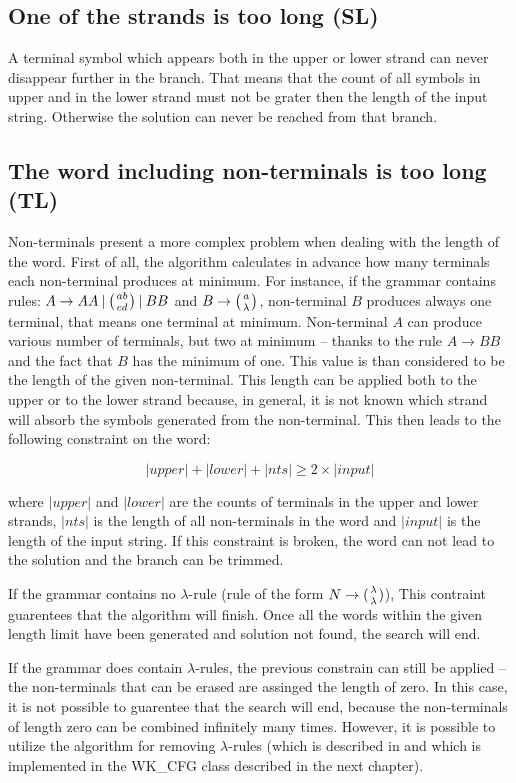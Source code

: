 \subsection{One of the strands is too long (SL)}
A terminal symbol which appears both in the upper or lower strand can never disappear further in the branch. That means that the count of all symbols in upper and in the lower strand must not be grater then the length of the input string. Otherwise the solution can never be reached from that branch.

\subsection{The word including non-terminals is too long (TL)}
Non-terminals present a more complex problem when dealing with the length of the word. First of all, the algorithm calculates in advance how many terminals each non-terminal produces at minimum. For instance, if the grammar contains rules: $A \rightarrow A A \:|\: \wkpair{ab}{cd} \:|\: B B$ and $B \rightarrow \wkpair{a}{\lambda}$, non-terminal $B$ produces always one terminal, that means one terminal at minimum. Non-terminal $A$ can produce various number of terminals, but two at minimum -- thanks to the rule $A \rightarrow B B$ and the fact that $B$ has the minimum of one. This value is than considered to be the length of the given non-terminal.
This length can be applied both to the upper or to the lower strand because, in general, it is not known which strand will absorb the symbols generated from the non-terminal.
This then leads to the following constraint on the word:

$$|upper| + |lower| + |nts| \geq 2 \times |input|$$

where $|upper|$ and $|lower|$ are the counts of terminals in the upper and lower strands, $|nts|$ is the length of all non-terminals in the word and $|input|$ is the length of the input string. If this constraint is broken, the word can not lead to the solution and the branch can be trimmed.


If the grammar contains no $\lambda$-rule (rule of the form $N \rightarrow ({\lambda \atop \lambda})$), This contraint guarentees that the algorithm will finish. Once all the words within the given length limit have been generated and solution not found, the search will end.

If the grammar does contain $\lambda$-rules, the previous constrain can still be applied -- the non-terminals that can be erased are assinged the length of zero. In this case, it is not possible to guarentee that the search will end, because the non-terminals of length zero can be combined infinitely many times. However, it is possible to utilize the algorithm for removing $\lambda$-rules (which is described in \cite{WK_CYK} and which is implemented in the WK\_CFG class described in the next chapter).

